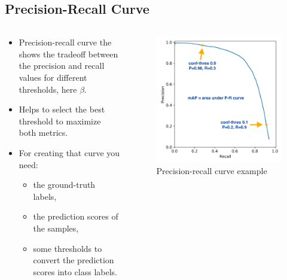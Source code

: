 \documentclass{beamer}
\begin{document}
\subsection{Precision-Recall Curve}
\begin{frame}{}
	\begin{columns}
		\begin{column}{0.6\textwidth}
			\begin{itemize}
				\item Precision-recall curve the shows the tradeoff between the precision and recall values for different thresholds, here $\beta$.
				\item Helps to select the best threshold to maximize both metrics.
				\item For creating that curve you need:
				\begin{itemize}
					\item the ground-truth labels,
					\item the prediction scores of the samples,
					\item some thresholds to convert the prediction scores into class labels.
				\end{itemize}
			\end{itemize}
		\end{column}
		\begin{column}{0.4\textwidth}
			\begin{figure}
				\includegraphics[width=\textwidth]{images/precision_recall.png}
				\caption{Precision-recall curve example}
			\end{figure}
		\end{column}
	\end{columns}
\end{frame}
\end{document}
